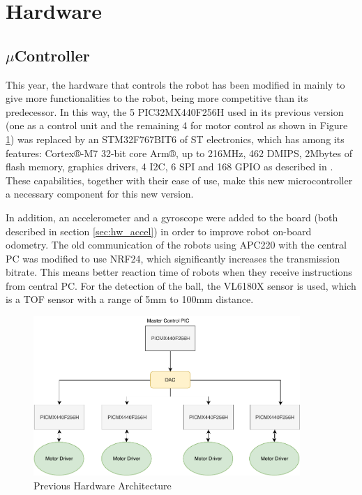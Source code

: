 \documentclass{llncs}
\begin{document}
%
\section{Hardware}
\subsection{$\mu$Controller}
\label{sec:hw_micro}
This year, the hardware that controls the robot has been modified in mainly to give more functionalities to the robot, being more competitive than its predecessor. In this way, the 5 PIC32MX440F256H used in its previous version (one as a control unit and the remaining 4 for motor control as shown in Figure \ref{fig:hw_old}) was replaced by an STM32F767BIT6 of ST electronics, which has among its features:  Cortex®-M7 32-bit core Arm®, up to 216MHz, 462 DMIPS, 2Mbytes of flash memory, graphics drivers, 4 I2C, 6 SPI and 168 GPIO as described in \cite{STdatasheet}. These capabilities, together with their ease of use, make this new microcontroller a necessary component for this new version.

In addition, an accelerometer and a gyroscope were added to the board (both described in section \ref{sec:hw_accel}) in order to improve robot on-board odometry. The old communication of the robots using APC220 with the central PC was modified to use NRF24, which significantly increases the transmission bitrate. This means better reaction time of robots when they receive instructions from central PC.  For the detection of the ball, the VL6180X sensor is used, which is a TOF sensor with a range of 5mm to 100mm distance.

\begin{figure}[H]
    \centering
    \includegraphics[width=0.9\textwidth]{Images/HardwareOLD.pdf}
    \caption{Previous Hardware Architecture}
    \label{fig:hw_old}
\end{figure}
\end{document}
